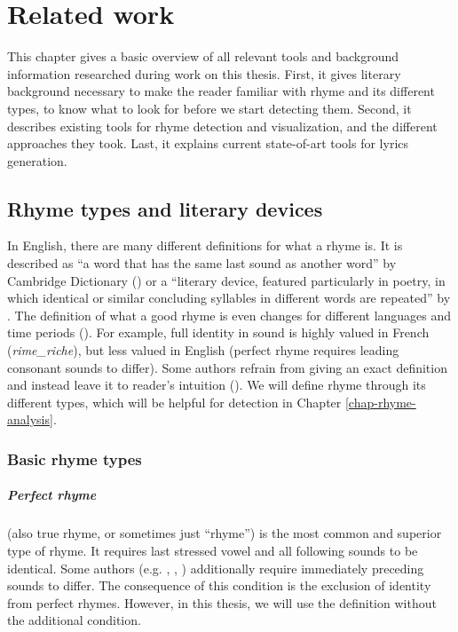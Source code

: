 \listofchanges
\chapter{Related work}\label{chap-related-work}
This chapter gives a basic overview of all relevant tools and background information researched during work on this thesis. First, it gives literary background necessary to make the reader familiar with rhyme and its different types, to know what to look for before we start detecting them. Second, it describes existing tools for rhyme detection and visualization, and the different approaches they took. Last, it explains current state-of-art tools for lyrics generation.


\section{Rhyme types and literary devices}

In English, there are many different definitions for what a rhyme is. It is described as ``a word that has the same last sound as another word'' by Cambridge Dictionary (\cite{walter2008cambridge}) or a ``literary device, featured particularly in poetry, in which identical or similar concluding syllables in different words are repeated'' by \cite{literarydevices2020}. The definition of what a good rhyme is even changes for different languages and time periods (\cite{zhirmunsky2013introduction}). For example, full identity in sound is highly valued in French (\textit{\gls{rime_riche}}), but less valued in English (perfect rhyme requires leading consonant sounds to differ). Some authors refrain from giving an exact definition and instead leave it to reader's intuition (\cite{plechavc2018collocation}). We will define rhyme through its different types, which will be helpful for detection in Chapter \ref{chap-rhyme-analysis}.

\subsection{Basic rhyme types}
\paragraph{Perfect rhyme} (also true rhyme, or sometimes just ``rhyme'') is the most common and superior type of rhyme. It requires last stressed vowel and all following sounds to be identical.
Some authors (e.g. \cite{bain1867manual}, \cite{vanphonological}, \cite{bergman2017litcharts}) additionally require immediately preceding sounds to differ. The consequence of this condition is the exclusion of identity from perfect rhymes. However, in this thesis, we will use the definition without the additional condition.

